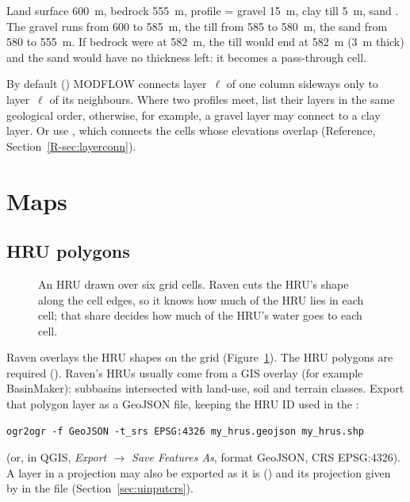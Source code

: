 \begin{example}
Land surface 600~m, bedrock 555~m, profile  = gravel 15~m, clay till 5~m, sand .
The gravel runs from 600 to 585~m, the till from 585 to 580~m, the sand from 580 to 555~m. If bedrock were at 582~m,
the till would end at 582~m (3~m thick) and the sand would have no thickness left: it becomes a pass-through cell.
\end{example}

\begin{watch}
By default () MODFLOW connects layer~$\ell$ of one column sideways only to layer~$\ell$ of its
neighbours. Where two profiles meet, list their layers in the same geological order, otherwise, for example, a gravel layer
may connect to a clay layer. Or use , which connects the cells whose elevations overlap
(Reference, Section~\ref{R-sec:layerconn}).
\end{watch}

\section{Maps}\label{sec:umaps}
\subsection{HRU polygons}
\begin{figure}[!htbp]\centering

\caption{An HRU drawn over six grid cells. Raven cuts the HRU's shape along the cell edges, so it knows how much of the HRU lies in each cell; that share decides how much of the HRU's water goes to each cell.}\label{fig:uhrucells}
\end{figure}
Raven overlays the HRU shapes on the grid (Figure~\ref{fig:uhrucells}).
The HRU polygons are required (). Raven's HRUs usually come from a GIS overlay (for
example BasinMaker): subbasins intersected with land-use, soil and terrain classes. Export that polygon layer as a GeoJSON
file, keeping the HRU ID used in the :
\par\noindent\begin{minipage}{\linewidth}
\begin{lstlisting}
ogr2ogr -f GeoJSON -t_srs EPSG:4326 my_hrus.geojson my_hrus.shp
\end{lstlisting}
\end{minipage}\par\smallskip
(or, in QGIS, \emph{Export $\rightarrow$ Save Features As}, format GeoJSON, CRS EPSG:4326). A layer in a projection may
also be exported as it is () and its projection given by
 in the  file (Section~\ref{sec:uinputcrs}).

